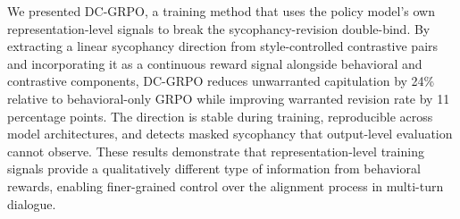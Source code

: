 \documentclass[11pt]{article}
\begin{document}
We presented DC-GRPO, a training method that uses the policy model's own representation-level signals to break the sycophancy-revision double-bind. By extracting a linear sycophancy direction from style-controlled contrastive pairs and incorporating it as a continuous reward signal alongside behavioral and contrastive components, DC-GRPO reduces unwarranted capitulation by 24\% relative to behavioral-only GRPO while improving warranted revision rate by 11 percentage points. The direction is stable during training, reproducible across model architectures, and detects masked sycophancy that output-level evaluation cannot observe. These results demonstrate that representation-level training signals provide a qualitatively different type of information from behavioral rewards, enabling finer-grained control over the alignment process in multi-turn dialogue.



\end{document}
